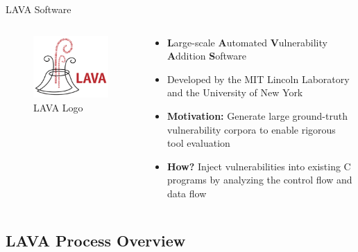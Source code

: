 \documentclass[aspectratio=169]{beamer}
\begin{document}
  \begin{frame}{LAVA Software}
    \begin{columns}
      \begin{column}{0.25\textwidth}
        \begin{figure}
          \centering
          \hspace{1em}
          \includegraphics[scale=0.35]{figures/lava-logo}
          \caption{LAVA Logo}
        \end{figure}
      \end{column}
      \begin{column}{0.75\textwidth}
        \begin{itemize}
        \setlength\itemsep{1em}
        \item \textbf{L}arge-scale \textbf{A}utomated \textbf{V}ulnerability \textbf{A}ddition \textbf{S}oftware
        \item Developed by the MIT Lincoln Laboratory and the University of New York
        \item \textbf{Motivation:} Generate \alert{large ground-truth vulnerability corpora} to enable rigorous tool evaluation
        \item \textbf{How?} Inject vulnerabilities into existing C programs by analyzing the \alert{control flow} and \alert{data flow}
        \end{itemize}
      \end{column}
    \end{columns}
  \end{frame}
  
  \subsection{LAVA Process Overview}
\end{document}

